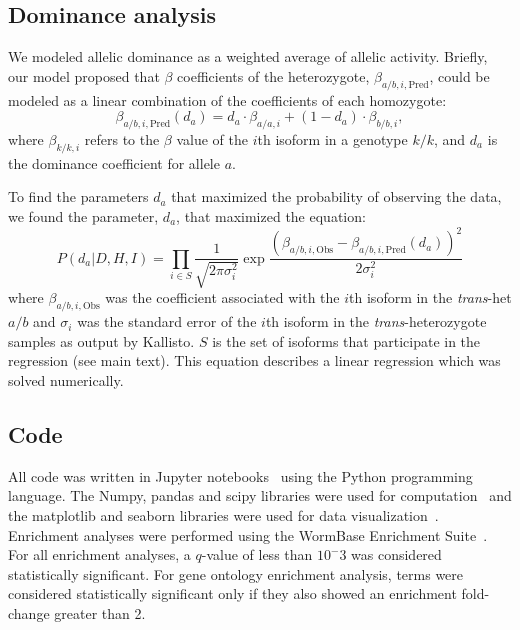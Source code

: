 \documentclass[10pt, twocolumn]{article}
\begin{document}
\subsection*{Dominance analysis}
\label{subsec:dominance}
We modeled allelic dominance as a weighted average of allelic activity. Briefly,
our model proposed that $\beta$ coefficients of the heterozygote,
$\beta_{a/b,i,\text{Pred}}$, could be modeled as a linear combination of the
coefficients of each homozygote:
\begin{equation}
  \beta_{a/b,i,\text{Pred}}(d_a) = d_a\cdot \beta_{a/a,i} + (1-d_a)\cdot \beta_{b/b,i},
\end{equation}
where $\beta_{k/k, i}$ refers to the $\beta$ value of the $i$th isoform in a
genotype $k/k$, and $d_a$ is the dominance coefficient for allele $a$.

To find the parameters $d_a$ that maximized the probability of observing the
data, we found the parameter, $d_a$, that maximized the equation:
\begin{equation}
    P(d_a|D,H,I) = \prod_{i \in S}\frac{1}{\sqrt{2\pi \sigma_i^2}}
                   \exp{\frac{{(\beta_{a/b,i,\text{Obs}} -
                                \beta_{a/b,i,\text{Pred}}(d_a))}^2}{
                                2\sigma_i^2}}
\end{equation}
where $\beta_{a/b,i,\text{Obs}}$ was the coefficient associated with the $i$th
isoform in the \emph{trans}-het $a/b$ and $\sigma_i$ was the standard error of the
$i$th isoform in the \emph{trans}-heterozygote samples as output by Kallisto. $S$ is
the set of isoforms that participate in the regression (see main text). This
equation describes a linear regression which was solved numerically.

\subsection*{Code}
All code was written in Jupyter notebooks~\cite{Perez2007} using the Python
programming language. The Numpy, pandas and scipy libraries were used for
computation~\cite{VanDerWalt2011,McKinney2011,Oliphant2007} and the matplotlib
and seaborn libraries were used for data visualization~\cite{Hunter2007,Waskom}.
Enrichment analyses were performed using the WormBase Enrichment
Suite~\cite{Angeles-Albores2016}. For all enrichment analyses, a $q$-value of
less than $10^-3$ was considered statistically significant. For gene ontology
enrichment analysis, terms were considered statistically significant only if they
also showed an enrichment fold-change greater than 2.
\end{document}
